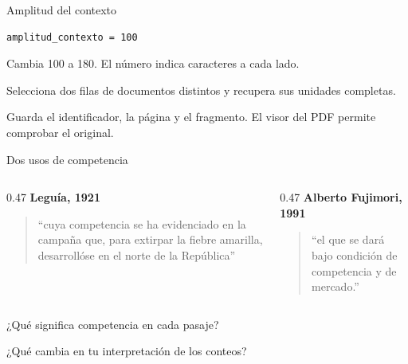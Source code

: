\begin{frame}[fragile,label=amplitud]{Amplitud del contexto}
  \begin{verbatim}
amplitud_contexto = 100
  \end{verbatim}\par
  Cambia 100 a 180. El número indica caracteres a cada lado.
  \par\vspace{0.3cm}
  Selecciona dos filas de documentos distintos y recupera sus unidades completas.
  \par\vspace{0.3cm}
  Guarda el identificador, la página y el fragmento. El visor del PDF permite comprobar el original.
\end{frame}

\begin{frame}[label=polisemia]{Dos usos de competencia}
\begin{columns}[T,onlytextwidth]
    \begin{column}{0.47\textwidth}
      \textbf{Leguía, 1921}\par
      \begin{quote}\raggedright
        \enquote{cuya competencia se ha evidenciado en la campaña que, para extirpar la fiebre amarilla, desarrollóse en el norte de la República}
      \end{quote}
    \end{column}
    \begin{column}{0.47\textwidth}
      \textbf{Alberto Fujimori, 1991}\par
      \begin{quote}\raggedright
        \enquote{el que se dará bajo condición de competencia y de mercado.}
      \end{quote}
    \end{column}
  \end{columns}
  \par\vspace{0.5cm}
  ¿Qué significa competencia en cada pasaje?\par
  ¿Qué cambia en tu interpretación de los conteos?
\end{frame}

